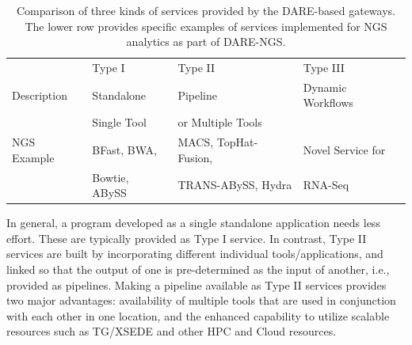 \documentclass[]{svjour3}
\begin{document}







\begin{table}[!h]
\centering
\begin{tabular}{| l | l | l | l |} \hline \rowcolor[rgb]{0.8,0.8,0.8} &
Type I & Type II & Type III \\ Description & Standalone & Pipeline & Dynamic  Workflows\\ 
& Single Tool & or Multiple Tools & \\\hline 
NGS Example & BFast, BWA, & MACS, TopHat-Fusion, &  Novel Service for 
 \\
 & Bowtie, ABySS & TRANS-ABySS, Hydra & RNA-Seq \\
\hline
\end{tabular}
\caption{Comparison of three kinds of services provided by the
 DARE-based gateways. The lower row provides specific examples of
 services implemented for NGS analytics as part of DARE-NGS.}
\label{table:three-type-service}
\end{table}


In general, a program developed as a single standalone application needs
less effort. These are typically provided as Type I service. In contrast,
Type II services are built by incorporating different individual
tools/applications, and linked so that the output of one is
pre-determined as the input of another, i.e., provided as pipelines.
Making a pipeline available as Type II services provides
two major advantages: availability of multiple tools that are used in
conjunction with each other in one location, and the enhanced
capability to utilize scalable resources such as TG/XSEDE and other
HPC and Cloud resources.
\end{document}
